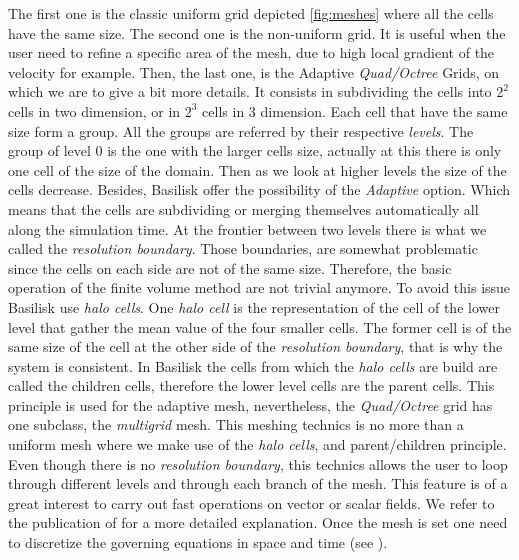 The first one is the classic uniform grid depicted \ref{fig:meshes} where all the cells have the same size.
The second one is the non-uniform grid. 
It is useful when the user need to refine a specific area of the mesh, due to high local gradient of the velocity for example.
Then, the last one, is the Adaptive \textit{Quad/Octree} Grids, on which we are to give a bit more details.
It consists in subdividing the cells into $2^2$ cells in two dimension, or in $2^3$ cells in 3 dimension. 
Each cell that have the same size form a group.
All the groups are referred by their respective \textit{levels}. 
The group of level 0 is the one with the larger cells size, actually at this there is only one cell of the size of the domain. 
Then as we look at higher levels the size of the cells decrease. 
Besides, Basilisk offer the possibility of the \textit{Adaptive} option. 
Which means that the cells are subdividing or merging themselves automatically all along the simulation time. 
At the frontier between two levels there is what we called the \textit{resolution boundary}. 
Those boundaries, are somewhat problematic since the cells on each side are not of the same size.
Therefore, the basic operation of the finite volume method are not trivial anymore. 
To avoid this issue Basilisk use \textit{halo cells}.
One \textit{halo cell} is the representation of the cell of the lower level that gather the mean value of the four smaller cells.
The former cell is of the same size of the cell at the other side of the \textit{resolution boundary}, that is why the system is consistent. 
In Basilisk the cells from which the \textit{halo cells} are build are called the children cells, therefore the lower level cells are the parent cells. 
This principle is used for the adaptive mesh, nevertheless, the \textit{Quad/Octree} grid has one subclass, the \textit{multigrid} mesh. 
This meshing technics is no more than a uniform mesh where we make use of the \textit{halo cells}, and parent/children principle. 
Even though there is no \textit{resolution boundary}, this technics allows the user to loop through different levels and through each branch of the mesh. 
This feature is of a great interest to carry out fast operations on vector or scalar fields. 
We refer to the publication of \citet{popinet2015quadtree} for a more detailed explanation.  
Once the mesh is set one need to discretize the governing equations in space and time (see \citet[chapter 3]{tryggvason2011direct}). 

